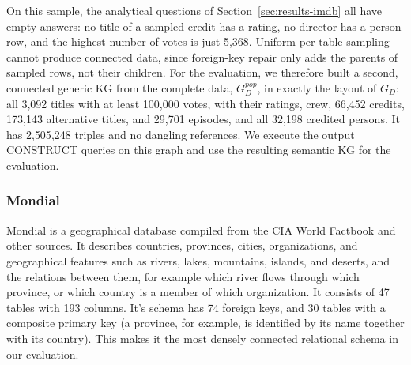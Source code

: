 
 On this sample, the analytical questions of Section~\ref{sec:results-imdb} all have empty answers: no title of a sampled credit has a rating, no director has a person row, and the highest number of votes is just 5{,}368. Uniform per-table sampling cannot produce connected data, since foreign-key repair only adds the parents of sampled rows, not their children. For the evaluation, we therefore built a second, connected generic KG from the complete data, \(G_D^{\mathit{pop}}\), in exactly the layout of \(G_D\): all 3{,}092 titles with at least 100{,}000 votes, with their ratings, crew, 66{,}452 credits, 173{,}143 alternative titles, and 29{,}701 episodes, and all 32{,}198 credited persons. It has 2{,}505{,}248 triples and no dangling references. We execute the output CONSTRUCT queries on this graph and use the resulting semantic KG for the evaluation.

\subsubsection{Mondial}

Mondial \citep{may-MONDIAL-report-99} is a geographical database compiled from the CIA World Factbook and other sources. It describes countries, provinces, cities, organizations, and geographical features such as rivers, lakes, mountains, islands, and deserts, and the relations between them, for example which river flows through which province, or which country is a member of which organization. It consists of 47 tables with 193 columns. It's schema has 74 foreign keys, and 30 tables with a composite primary key (a province, for example, is identified by its name together with its country). This makes it the most densely connected relational schema in our evaluation.

